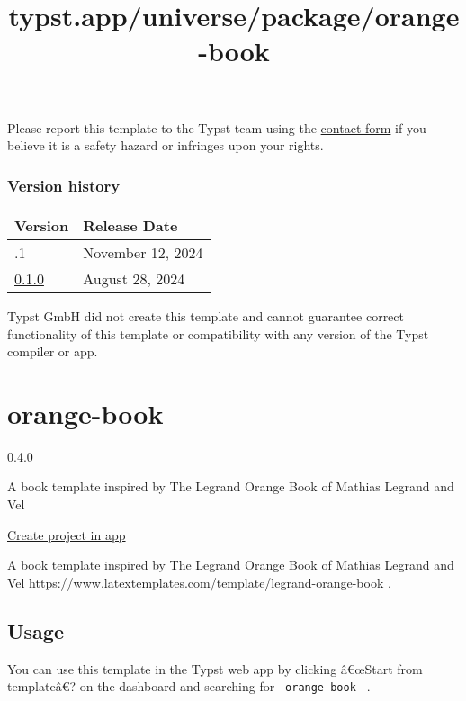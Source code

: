 Please report this template to the Typst team using the
\href{https://typst.app/contact}{contact form} if you believe it is a
safety hazard or infringes upon your rights.

\label{versions}
\subsubsection{Version history}\label{version-history}

\begin{longtable}[]{@{}ll@{}}
\toprule\noalign{}
Version & Release Date \\
\midrule\noalign{}
\endhead
\bottomrule\noalign{}
\endlastfoot
0.1.1 & November 12, 2024 \\
\href{https://typst.app/universe/package/touying-simpl-hkustgz/0.1.0/}{0.1.0}
& August 28, 2024 \\
\end{longtable}

Typst GmbH did not create this template and cannot guarantee correct
functionality of this template or compatibility with any version of the
Typst compiler or app.


\title{typst.app/universe/package/orange-book}

\label{banner}
\label{template-thumbnail}

\section{orange-book}\label{orange-book}

{ 0.4.0 }

A book template inspired by The Legrand Orange Book of Mathias Legrand
and Vel

\href{/app?template=orange-book&version=0.4.0}{Create project in app}

\label{readme}
A book template inspired by The Legrand Orange Book of Mathias Legrand
and Vel
\url{https://www.latextemplates.com/template/legrand-orange-book} .

\subsection{Usage}\label{usage}

You can use this template in the Typst web app by clicking â€œStart from
templateâ€? on the dashboard and searching for \texttt{\ orange-book\ }
.

